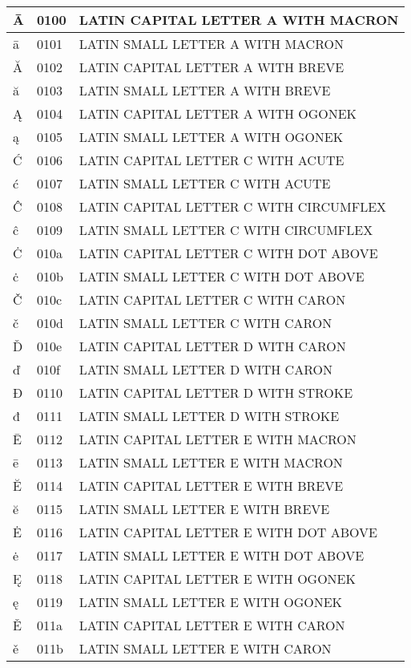 \documentclass[12pt,letterpaper,openany]{book}
\begin{document}
\begin{center}
\begin{supertabular}{|m{0.25in}|m{0.5in}|m{4in}|}
Ā & 0100 & LATIN CAPITAL LETTER A WITH MACRON\\\hline
ā & 0101 & LATIN SMALL LETTER A WITH MACRON\\\hline
Ă & 0102 & LATIN CAPITAL LETTER A WITH BREVE\\\hline
ă & 0103 & LATIN SMALL LETTER A WITH BREVE\\\hline
Ą & 0104 & LATIN CAPITAL LETTER A WITH OGONEK\\\hline
ą & 0105 & LATIN SMALL LETTER A WITH OGONEK\\\hline
Ć & 0106 & LATIN CAPITAL LETTER C WITH ACUTE\\\hline
ć & 0107 & LATIN SMALL LETTER C WITH ACUTE\\\hline
Ĉ & 0108 & LATIN CAPITAL LETTER C WITH CIRCUMFLEX\\\hline
ĉ & 0109 & LATIN SMALL LETTER C WITH CIRCUMFLEX\\\hline
Ċ & 010a & LATIN CAPITAL LETTER C WITH DOT ABOVE\\\hline
ċ & 010b & LATIN SMALL LETTER C WITH DOT ABOVE\\\hline
Č & 010c & LATIN CAPITAL LETTER C WITH CARON\\\hline
č & 010d & LATIN SMALL LETTER C WITH CARON\\\hline
Ď & 010e & LATIN CAPITAL LETTER D WITH CARON\\\hline
ď & 010f & LATIN SMALL LETTER D WITH CARON\\\hline
Đ & 0110 & LATIN CAPITAL LETTER D WITH STROKE\\\hline
đ & 0111 & LATIN SMALL LETTER D WITH STROKE\\\hline
Ē & 0112 & LATIN CAPITAL LETTER E WITH MACRON\\\hline
ē & 0113 & LATIN SMALL LETTER E WITH MACRON\\\hline
Ĕ & 0114 & LATIN CAPITAL LETTER E WITH BREVE\\\hline
ĕ & 0115 & LATIN SMALL LETTER E WITH BREVE\\\hline
Ė & 0116 & LATIN CAPITAL LETTER E WITH DOT ABOVE\\\hline
ė & 0117 & LATIN SMALL LETTER E WITH DOT ABOVE\\\hline
Ę & 0118 & LATIN CAPITAL LETTER E WITH OGONEK\\\hline
ę & 0119 & LATIN SMALL LETTER E WITH OGONEK\\\hline
Ě & 011a & LATIN CAPITAL LETTER E WITH CARON\\\hline
ě & 011b & LATIN SMALL LETTER E WITH CARON\\\hline

\end{supertabular}
\end{center}
\end{document}
